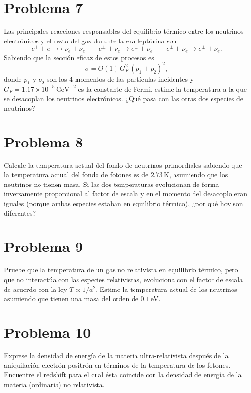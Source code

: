 \documentclass[11pt,a4paper]{article}
\begin{document}
\section*{Problema 7}
Las principales reacciones responsables del equilibrio térmico entre los neutrinos electrónicos y el resto del gas durante la era leptónica son
\begin{equation}
  e^++e^-\leftrightarrow \nu_e+\bar\nu_e \qquad e^\pm+\nu_e\rightarrow e^\pm+\nu_e \qquad e^\pm+\bar\nu_e\rightarrow e^\pm+\bar\nu_e.
\end{equation}
Sabiendo que la sección eficaz de estos procesos es
\begin{equation}
  \sigma=O(1)\,G_F^2\,(p_1+p_2)^2,
\end{equation}
donde $p_1$ y $p_2$ son los 4-momentos de las partículas incidentes y $G_F=1.17\times10^{-5}\,\text{GeV}^{-2}$ es la constante de Fermi, estime la temperatura a la que se desacoplan los neutrinos electrónicos. ¿Qué pasa con las otras dos especies de neutrinos?

\section*{Problema 8}
Calcule la temperatura actual del fondo de neutrinos primordiales sabiendo que la temperatura actual del fondo de fotones es de $2.73\,\text{K}$, asumiendo que los neutrinos no tienen masa. Si las dos temperaturas evolucionan de forma inversamente proporcional al factor de escala y en el momento del desacoplo eran iguales (porque ambas especies estaban en equilibrio térmico), ¿por qué hoy son diferentes?

\section*{Problema 9}
Pruebe que la temperatura de un gas no relativista en equilibrio térmico, pero que no interactúa con las especies relativistas, evoluciona con el factor de escala de acuerdo con la ley $T\propto 1/a^2$. Estime la temperatura actual de los neutrinos asumiendo que tienen una masa del orden de $0.1\,\text{eV}$.

\section*{Problema 10}
Exprese la densidad de energía de la materia ultra-relativista después de la aniquilación electrón-positrón en términos de la temperatura de los fotones. Encuentre el redshift para el cual ésta coincide con la densidad de energía de la materia (ordinaria) no relativista.
\end{document}
